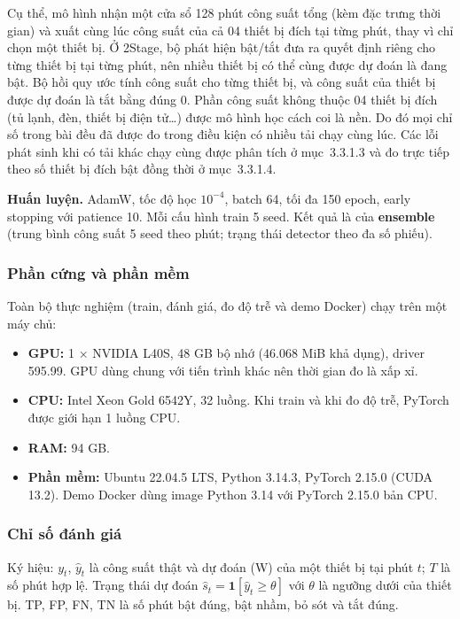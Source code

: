 Cụ thể, mô hình nhận một cửa sổ 128 phút công suất tổng (kèm đặc trưng thời gian) và xuất cùng lúc công suất của cả 04 thiết bị đích tại từng phút, thay vì chỉ chọn một thiết bị. Ở 2Stage, bộ phát hiện bật/tắt đưa ra quyết định riêng cho từng thiết bị tại từng phút, nên nhiều thiết bị có thể cùng được dự đoán là đang bật. Bộ hồi quy ước tính công suất cho từng thiết bị, và công suất của thiết bị được dự đoán là tắt bằng đúng 0. Phần công suất không thuộc 04 thiết bị đích (tủ lạnh, đèn, thiết bị điện tử…) được mô hình học cách coi là nền. Do đó mọi chỉ số trong bài đều đã được đo trong điều kiện có nhiều tải chạy cùng lúc. Các lỗi phát sinh khi có tải khác chạy cùng được phân tích ở mục~3.3.1.3 và đo trực tiếp theo số thiết bị đích bật đồng thời ở mục~3.3.1.4.

\textbf{Huấn luyện.} AdamW, tốc độ học $10^{-4}$, batch 64, tối đa 150 epoch, early stopping với patience 10. Mỗi cấu hình train 5 seed. Kết quả là của \textbf{ensemble} (trung bình công suất 5 seed theo phút; trạng thái detector theo đa số phiếu).

\subsubsection{Phần cứng và phần mềm}

Toàn bộ thực nghiệm (train, đánh giá, đo độ trễ và demo Docker) chạy trên một máy chủ:

\begin{itemize}
\item \textbf{GPU:} 1 × NVIDIA L40S, 48 GB bộ nhớ (46.068 MiB khả dụng), driver 595.99. GPU dùng chung với tiến trình khác nên thời gian đo là xấp xỉ.
\item \textbf{CPU:} Intel Xeon Gold 6542Y, 32 luồng. Khi train và khi đo độ trễ, PyTorch được giới hạn 1 luồng CPU.
\item \textbf{RAM:} 94 GB.
\item \textbf{Phần mềm:} Ubuntu 22.04.5 LTS, Python 3.14.3, PyTorch 2.15.0 (CUDA 13.2). Demo Docker dùng image Python 3.14 với PyTorch 2.15.0 bản CPU.
\end{itemize}

\subsubsection{Chỉ số đánh giá}

Ký hiệu: $y_t$, $\hat{y}_t$ là công suất thật và dự đoán (W) của một thiết bị tại phút $t$; $T$ là số phút hợp lệ. Trạng thái dự đoán $\hat{s}_t = \mathbf{1}\left[\hat{y}_t \ge \theta\right]$ với $\theta$ là ngưỡng dưới của thiết bị. TP, FP, FN, TN là số phút bật đúng, bật nhầm, bỏ sót và tắt đúng.


